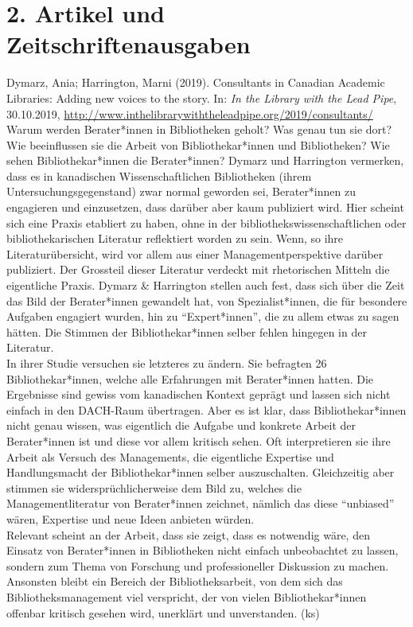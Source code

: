 \documentclass[a4paper,
fontsize=11pt,
oneside,
numbers=noperiodatend,
parskip=half-,
bibliography=totoc,
final
]{scrartcl}
\begin{document}
\hypertarget{artikel-und-zeitschriftenausgaben}{%
\section{2. Artikel und
Zeitschriftenausgaben}\label{artikel-und-zeitschriftenausgaben}}

Dymarz, Ania; Harrington, Marni (2019). Consultants in Canadian Academic
Libraries: Adding new voices to the story. In: \emph{In the Library with
the Lead Pipe}, 30.10.2019,
\url{http://www.inthelibrarywiththeleadpipe.org/2019/consultants/}\\
Warum werden Berater*innen in Bibliotheken geholt? Was genau tun sie
dort? Wie beeinflussen sie die Arbeit von Bibliothekar*innen und
Bibliotheken? Wie sehen Bibliothekar*innen die Berater*innen? Dymarz und
Harrington vermerken, dass es in kanadischen Wissenschaftlichen
Bibliotheken (ihrem Untersuchungsgegenstand) zwar normal geworden sei,
Berater*innen zu engagieren und einzusetzen, dass darüber aber kaum
publiziert wird. Hier scheint sich eine Praxis etabliert zu haben, ohne
in der bibliothekswissenschaftlichen oder bibliothekarischen Literatur
reflektiert worden zu sein. Wenn, so ihre Literaturübersicht, wird vor
allem aus einer Managementperspektive darüber publiziert. Der Grossteil
dieser Literatur verdeckt mit rhetorischen Mitteln die eigentliche
Praxis. Dymarz \& Harrington stellen auch fest, dass sich über die Zeit
das Bild der Berater*innen gewandelt hat, von Spezialist*innen, die für
besondere Aufgaben engagiert wurden, hin zu ``Expert*innen'', die zu
allem etwas zu sagen hätten. Die Stimmen der Bibliothekar*innen selber
fehlen hingegen in der Literatur.\\
In ihrer Studie versuchen sie letzteres zu ändern. Sie befragten 26
Bibliothekar*innen, welche alle Erfahrungen mit Berater*innen hatten.
Die Ergebnisse sind gewiss vom kanadischen Kontext geprägt und lassen
sich nicht einfach in den DACH-Raum übertragen. Aber es ist klar, dass
Bibliothekar*innen nicht genau wissen, was eigentlich die Aufgabe und
konkrete Arbeit der Berater*innen ist und diese vor allem kritisch
sehen. Oft interpretieren sie ihre Arbeit als Versuch des Managements,
die eigentliche Expertise und Handlungsmacht der Bibliothekar*innen
selber auszuschalten. Gleichzeitig aber stimmen sie
widersprüchlicherweise dem Bild zu, welches die Managementliteratur von
Berater*innen zeichnet, nämlich das diese ``unbiased'' wären, Expertise
und neue Ideen anbieten würden.\\
Relevant scheint an der Arbeit, dass sie zeigt, dass es notwendig wäre,
den Einsatz von Berater*innen in Bibliotheken nicht einfach unbeobachtet
zu lassen, sondern zum Thema von Forschung und professioneller
Diskussion zu machen. Ansonsten bleibt ein Bereich der
Bibliotheksarbeit, von dem sich das Bibliotheksmanagement viel
verspricht, der von vielen Bibliothekar*innen offenbar kritisch gesehen
wird, unerklärt und unverstanden. (ks)
\end{document}
